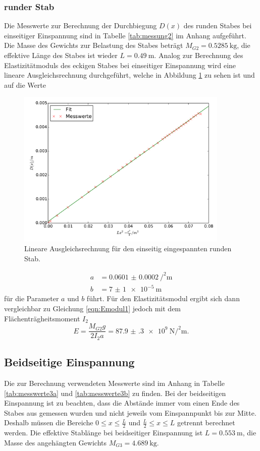 \subsubsection{runder Stab}
Die Messwerte zur Berechnung der Durchbiegung $D(x)$ des runden Stabes bei
einseitiger Einspannung sind in Tabelle \ref{tab:messung2} im Anhang aufgeführt.
Die Masse des Gewichts zur Belastung des Stabes beträgt $M_{G2} = \SI{0.5285}
{\kilo\gram}$, die effektive Länge des Stabes ist wieder $L=\SI{0.49}
{\meter}$. Analog zur Berechnung des Elastizitätmoduls des eckigen Stabes bei
einseitiger Einspannung wird eine lineare Ausgleichsrechnung durchgeführt, welche
in Abbildung \ref{fig:plot_einseitig2} zu sehen ist und auf die Werte
\begin{figure}
  \centering
  \includegraphics[width=0.9\textwidth]{stab2_einseitig.pdf}
  \caption{Lineare Ausgleichsrechnung für den einseitig eingespannten runden Stab.}
  \label{fig:plot_einseitig2}
\end{figure}
\begin{align*}
  a &= \SI{0.0601(2)}{\per\squared\meter} \\
  b &= \SI{7(1)e-5}{\meter}
\end{align*}
für die Parameter $a$ und $b$ führt. Für den Elastizitätsmodul ergibt sich dann
vergleichbar zu Gleichung \eqref{eqn:Emodul1} jedoch mit dem Flächenträgheitsmoment
$I_2$
\begin{equation}
  E = \frac{M_{G2} g}{2 I_2 a} = \SI{87.9(3)e+9}{\newton\per\squared\meter}.
\end{equation}

\subsection{Beidseitige Einspannung}
Die zur Berechnung verwendeten Messwerte sind im Anhang in Tabelle \ref{tab:messwerte3a}
und \ref{tab:messwerte3b} zu finden. Bei der beidseitigen Einspannung ist zu
beachten, dass die Abstände immer vom einen Ende des Stabes aus gemessen wurden
und nicht jeweils vom Einspannpunkt bis zur Mitte. Deshalb müssen die Bereiche
$0\leq x \leq \frac{L}{2}$ und $\frac{L}{2}\leq x \leq L$ getrennt berechnet 
werden. Die effektive Stablänge bei beidseitiger Einspannung ist $L= \SI{0.553}
{\meter}$, die Masse des angehängten Gewichts $M_{G3} = \SI{4.689} {\kilo\gram}$.

